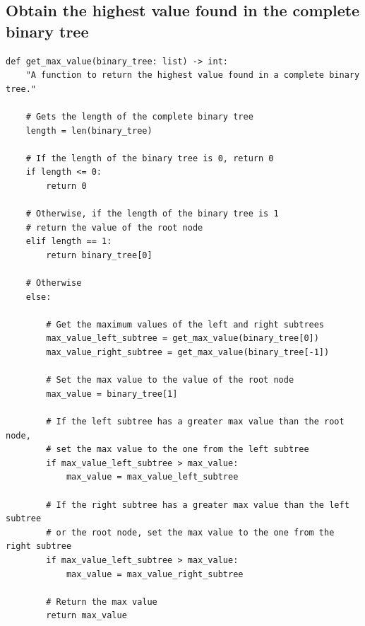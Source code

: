 \documentclass[11pt]{article}
\begin{document}
\subsection{Obtain the highest value found in the complete binary tree}
\label{sec:org3834fb3}
\begin{verbatim}
def get_max_value(binary_tree: list) -> int:
    "A function to return the highest value found in a complete binary tree."

    # Gets the length of the complete binary tree
    length = len(binary_tree)

    # If the length of the binary tree is 0, return 0
    if length <= 0:
        return 0

    # Otherwise, if the length of the binary tree is 1
    # return the value of the root node
    elif length == 1:
        return binary_tree[0]

    # Otherwise
    else:

        # Get the maximum values of the left and right subtrees
        max_value_left_subtree = get_max_value(binary_tree[0])
        max_value_right_subtree = get_max_value(binary_tree[-1])

        # Set the max value to the value of the root node
        max_value = binary_tree[1]

        # If the left subtree has a greater max value than the root node,
        # set the max value to the one from the left subtree
        if max_value_left_subtree > max_value:
            max_value = max_value_left_subtree

        # If the right subtree has a greater max value than the left subtree
        # or the root node, set the max value to the one from the right subtree
        if max_value_left_subtree > max_value:
            max_value = max_value_right_subtree

        # Return the max value
        return max_value
\end{verbatim}

 \newpage
\end{document}
